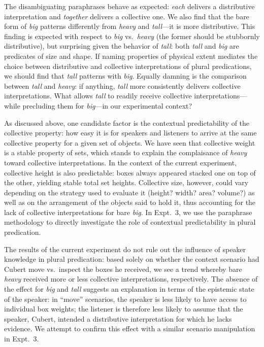 \documentclass[linguex]{sp}
\begin{document}
The disambiguating paraphrases behave as expected: \emph{each} delivers a distributive interpretation and \emph{together} delivers a collective one. We also find that the bare form of \emph{big} patterns differently from \emph{heavy} and \emph{tall}---it is more distributive. This finding is expected with respect to \textit{big} vs.~\textit{heavy} (the former should be stubbornly distributive), but surprising given the behavior of \textit{tall}: both \emph{tall} and \emph{big} are predicates of size and shape. If naming properties of physical extent mediates the choice between distributive and collective interpretations of plural predications, we should find that \emph{tall} patterns with \emph{big}. Equally damning is the comparison between \emph{tall} and \emph{heavy}: if anything, \emph{tall} more consistently delivers collective interpretations. What allows \emph{tall} to readily receive collective interpretations---while precluding them for \emph{big}---in our experimental context? 

As discussed above, one candidate factor is the contextual predictability of the collective property: how easy it is for speakers and listeners to arrive at the same collective property for a given set of objects. We have seen that collective weight is a stable property of sets, which stands to explain the complaisance of \emph{heavy} toward collective interpretations. In the context of the current experiment, collective height is also predictable: boxes  always appeared stacked one on top of the other, yielding stable total set heights. Collective size, however, could vary depending on the strategy used to evaluate it (height? width? area? volume?) as well as on the arrangement of the objects said to hold it, thus accounting for the lack of collective interpretations for bare \emph{big}. In Expt.~3, we use the paraphrase methodology to directly investigate the role of contextual predictability in plural predication.

The results of the current experiment do not rule out the influence of speaker knowledge in plural predication: based solely on whether the context scenario had Cubert move vs.~inspect the boxes he received, we see a trend whereby bare \emph{heavy} received more or less collective interpretations, respectively. The absence of the effect for \emph{big} and \emph{tall} suggests an explanation in terms of the epistemic state of the speaker: in ``move'' scenarios, the speaker is less likely to have access to individual box weights; the listener is therefore less likely to assume that the speaker, Cubert, intended a distributive interpretation for which he lacks evidence. We attempt to confirm this effect with a similar scenario manipulation in Expt.~3.
\end{document}
